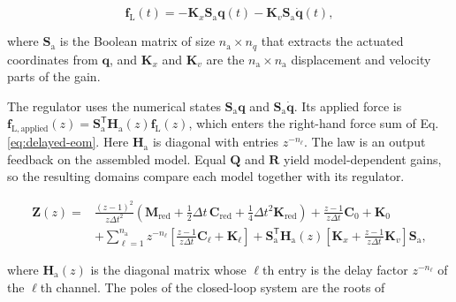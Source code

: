 \documentclass[a4paper,fleqn,review,12pt]{cas-sc}
\numberwithin{equation}{section}
\newcommand{\rev}[1]{{\color{red}#1}}
\begin{document}
\begin{equation}
	\bm{f}_{\mathrm{L}}(t)=
	-\mathbf{K}_{x}\mathbf{S}_{\mathrm{a}}\bm{q}(t)
	-\mathbf{K}_{v}\mathbf{S}_{\mathrm{a}}\dot{\bm{q}}(t),
	\label{eq:lqr-law}
\end{equation}

\noindent where \(\mathbf{S}_{\mathrm{a}}\) is the Boolean matrix of size \(n_{\mathrm{a}}\times n_{q}\) that extracts the actuated coordinates from \(\bm{q}\), and \(\mathbf{K}_{x}\) and \(\mathbf{K}_{v}\) are the \(n_{\mathrm{a}}\times n_{\mathrm{a}}\) displacement and velocity parts of the gain.

\rev{The regulator uses the numerical states \(\mathbf S_{\mathrm a}\bm q\) and \(\mathbf S_{\mathrm a}\dot{\bm q}\). Its applied force is
\(\bm f_{\mathrm{L,applied}}(z)=\mathbf S_{\mathrm a}^{\mathsf T}\mathbf H_{\mathrm a}(z)\bm f_{\mathrm L}(z)\),
which enters the right-hand force sum of Eq. \eqref{eq:delayed-eom}. Here \(\mathbf H_{\mathrm a}\) is diagonal with entries \(z^{-n_\ell}\). The law is an output feedback on the assembled model. Equal \(\mathbf Q\) and \(\mathbf R\) yield model-dependent gains, so the resulting domains compare each model together with its regulator.}

\begin{equation}
	\begin{aligned}
		\mathbf{Z}(z)={}&
		\frac{(z-1)^{2}}{z\Delta t^{2}}
		\left(\mathbf{M}_{\mathrm{red}}
		+\tfrac{1}{2}\Delta t\,\mathbf{C}_{\mathrm{red}}
		+\tfrac{1}{4}\Delta t^{2}\mathbf{K}_{\mathrm{red}}\right)
		+\frac{z-1}{z\Delta t}\mathbf{C}_{0}+\mathbf{K}_{0}\\
		&+\sum_{\ell=1}^{n_{\mathrm{a}}}z^{-n_{\ell}}
		\left[
		\frac{z-1}{z\Delta t}\mathbf{C}_{\ell}+\mathbf{K}_{\ell}
		\right]
		+\mathbf{S}_{\mathrm{a}}^{\mathsf{T}}\mathbf{H}_{\mathrm{a}}(z)
		\left[
		\mathbf{K}_{x}+\frac{z-1}{z\Delta t}\mathbf{K}_{v}
		\right]\mathbf{S}_{\mathrm{a}},
	\end{aligned}
	\label{eq:z-matrix}
\end{equation}

\noindent where \(\mathbf{H}_{\mathrm{a}}(z)\) is the diagonal matrix whose \(\ell\)th entry is the delay factor \(z^{-n_{\ell}}\) of the \(\ell\)th channel. The poles of the closed-loop system are the roots of
\end{document}
